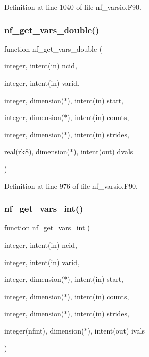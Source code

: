 Definition at line 1040 of file nf\+\_\+varsio.\+F90.

\mbox{\label{nf__varsio_8F90_a348edafd5b086a88462c1965a0a33892}} 
\subsubsection{\texorpdfstring{nf\+\_\+get\+\_\+vars\+\_\+double()}{nf\_get\_vars\_double()}}
{\footnotesize\ttfamily function nf\+\_\+get\+\_\+vars\+\_\+double (\begin{DoxyParamCaption}\item[{integer, intent(in)}]{ncid,  }\item[{integer, intent(in)}]{varid,  }\item[{integer, dimension($\ast$), intent(in)}]{start,  }\item[{integer, dimension($\ast$), intent(in)}]{counts,  }\item[{integer, dimension($\ast$), intent(in)}]{strides,  }\item[{real(rk8), dimension($\ast$), intent(out)}]{dvals }\end{DoxyParamCaption})}



Definition at line 976 of file nf\+\_\+varsio.\+F90.

\mbox{\label{nf__varsio_8F90_a1eb11535e4e9a1f71739815c851b0957}} 
\subsubsection{\texorpdfstring{nf\+\_\+get\+\_\+vars\+\_\+int()}{nf\_get\_vars\_int()}}
{\footnotesize\ttfamily function nf\+\_\+get\+\_\+vars\+\_\+int (\begin{DoxyParamCaption}\item[{integer, intent(in)}]{ncid,  }\item[{integer, intent(in)}]{varid,  }\item[{integer, dimension($\ast$), intent(in)}]{start,  }\item[{integer, dimension($\ast$), intent(in)}]{counts,  }\item[{integer, dimension($\ast$), intent(in)}]{strides,  }\item[{integer(nfint), dimension($\ast$), intent(out)}]{ivals }\end{DoxyParamCaption})}



